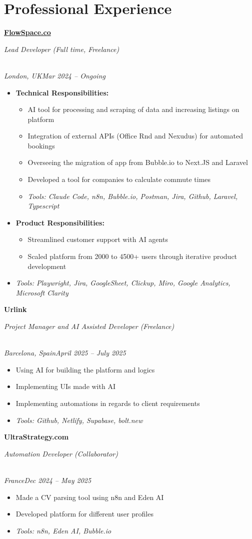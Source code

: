 \documentclass[a4paper,10pt]{article}
\newcommand{\role}[4]{\vspace{3pt}\noindent\hspace{0.6em}\parbox[t]{0.38\textwidth}{\raggedright\textbf{#1}}\hfill\parbox[t]{0.58\textwidth}{\raggedleft\textit{#2}}\\{\textit{#3}\hfill\textit{#4}}\vspace{1pt}}
\begin{document}
\section{Professional Experience}
\role{\href{https://flowspace.co}{FlowSpace.co}}{Lead Developer (Full time, Freelance)}{London, UK}{Mar 2024 -- Ongoing}
\begin{itemize}
\item \textbf{Technical Responsibilities:}
\begin{itemize}[label=--]
\item AI tool for processing and scraping of data and increasing listings on platform
\item Integration of external APIs (Office Rnd and Nexudus) for automated bookings
\item Overseeing the migration of app from Bubble.io to Next.JS and Laravel
\item Developed a tool for companies to calculate commute times
\item \textit{Tools: Claude Code, n8n, Bubble.io, Postman, Jira, Github, Laravel, Typescript}
\end{itemize}
\item \textbf{Product Responsibilities:}
\begin{itemize}[label=--]
\item Streamlined customer support with AI agents
\item Scaled platform from 2000 to 4500+ users through iterative product development
\end{itemize}
\item \textit{Tools: Playwright, Jira, GoogleSheet, Clickup, Miro, Google Analytics, Microsoft Clarity}
\end{itemize}

\role{Urlink}{Project Manager and AI Assisted Developer (Freelance)}{Barcelona, Spain}{April 2025 -- July 2025}
\begin{itemize}
\item Using AI for building the platform and logics
\item Implementing UIs made with AI
\item Implementing automations in regards to client requirements
\item \textit{Tools: Github, Netlify, Supabase, bolt.new}
\end{itemize}

\role{UltraStrategy.com}{Automation Developer (Collaborator)}{France}{Dec 2024 -- May 2025}
\begin{itemize}
\item Made a CV parsing tool using n8n and Eden AI
\item Developed platform for different user profiles
\item \textit{Tools: n8n, Eden AI, Bubble.io}
\end{itemize}
\end{document}
